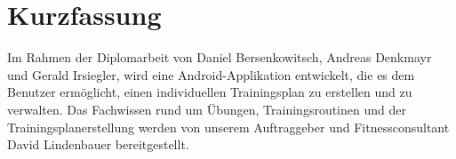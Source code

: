 \documentclass[FIPLY_base.tex]{subfiles}
\begin{document}

\section{Kurzfassung}
Im Rahmen der Diplomarbeit von Daniel Bersenkowitsch, Andreas Denkmayr und Gerald Irsiegler, wird eine Android-Applikation entwickelt, die es dem Benutzer ermöglicht, einen individuellen Trainingsplan zu erstellen und zu verwalten.
Das Fachwissen rund um Übungen, Trainingsroutinen und der Trainingsplanerstellung werden von unserem Auftraggeber und Fitnessconsultant David Lindenbauer bereitgestellt.
\end{document}
